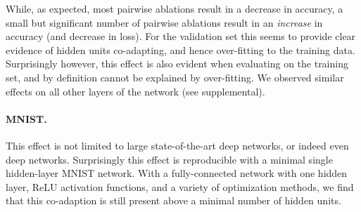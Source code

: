 \documentclass[thesis]{subfiles}
\begin{document}
While, as expected, most pairwise ablations result in a decrease in accuracy, a small but significant number of pairwise ablations result in an \emph{increase} in accuracy (and decrease in loss). For the validation set this seems to provide clear evidence of hidden units co-adapting, and hence over-fitting to the training data. Surprisingly however, this effect is also evident when evaluating on the training set, and by definition cannot be explained by over-fitting. We observed similar effects on all other layers of the network (see supplemental).


\paragraph{MNIST.} This effect is not limited to large state-of-the-art deep networks, or indeed even deep networks. Surprisingly this effect is reproducible with a minimal single hidden-layer MNIST network. With a fully-connected network with one hidden layer, ReLU activation functions, and a variety of optimization methods, we find that this co-adaption is still present above a minimal number of hidden units.  
\end{document}
